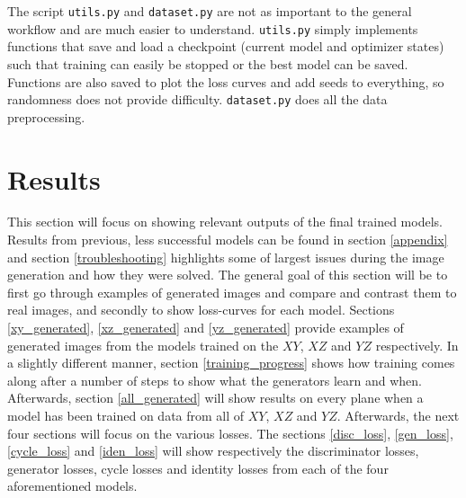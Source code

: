 \documentclass[12pt, fleqn, titlepage]{article}
\begin{document}
The script \texttt{utils.py} and \texttt{dataset.py} are not as important to the general workflow and are much easier to understand. \texttt{utils.py} simply implements functions that save and load a checkpoint (current model and optimizer states) such that training can easily be stopped or the best model can be saved. Functions are also saved to plot the loss curves and add seeds to everything, so randomness does not provide difficulty. \texttt{dataset.py} does all the data preprocessing.

\section{Results}\label{results}




This section will focus on showing relevant outputs of the final trained models. Results from previous, less successful models can be found in section \ref{appendix} and section \ref{troubleshooting} highlights some of largest issues during the image generation and how they were solved. The general goal of this section will be to first go through examples of generated images and compare and contrast them to real images, and secondly to show loss-curves for each model. Sections \ref{xy_generated}, \ref{xz_generated} and \ref{yz_generated} provide examples of generated images from the models trained on the $XY$, $XZ$ and $YZ$ respectively. In a slightly different manner, section \ref{training_progress} shows how training comes along after a number of steps to show what the generators learn and when. Afterwards, section \ref{all_generated} will show results on every plane when a model has been trained on data from all of $XY$, $XZ$ and $YZ$. Afterwards, the next four sections will focus on the various losses. The sections \ref{disc_loss}, \ref{gen_loss}, \ref{cycle_loss} and \ref{iden_loss} will show respectively the discriminator losses, generator losses, cycle losses and identity losses from each of the four aforementioned models.
\end{document}
